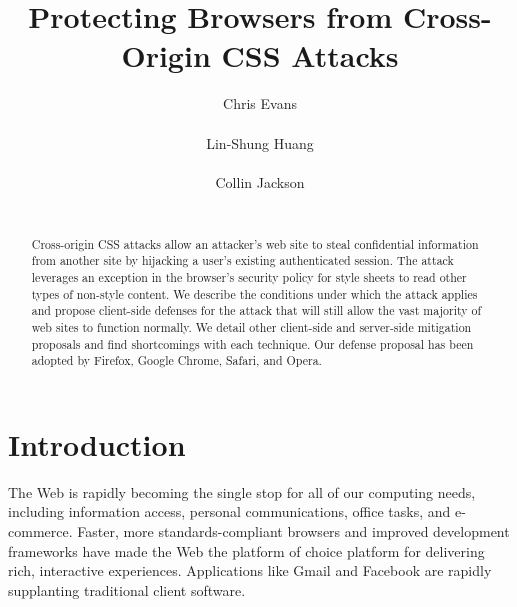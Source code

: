 \documentclass{acm_proc_article-sp}
\begin{document}
\title{Protecting Browsers from Cross-Origin CSS Attacks}
\author{
\alignauthor
Chris Evans\\
      \\
\alignauthor
Lin-Shung Huang\\
      \\
\alignauthor
Collin Jackson\\
      \\
}

\newcommand{\todo}[1]{\textbf{[TODO: #1]}}

\maketitle
\begin{abstract}
Cross-origin CSS attacks allow an attacker's web site to steal confidential information from another site by hijacking a user's existing authenticated session. The attack leverages an exception in the browser's security policy for style sheets to read other types of non-style content. We describe the conditions under which the attack applies and propose client-side defenses for the attack that will still allow the vast majority of web sites to function normally. We detail other client-side and server-side mitigation proposals and find shortcomings with each technique. Our defense proposal has been adopted by Firefox, Google Chrome, Safari, and Opera.
\end{abstract}




\section{Introduction}

The Web is rapidly becoming the single stop for all of our computing needs,
including information access, personal communications, office tasks, and
e-commerce. Faster, more standards-compliant browsers and improved development
frameworks have made the Web the platform of choice platform for delivering
rich, interactive experiences. Applications like Gmail and Facebook are
rapidly supplanting traditional client software.
\end{document}
